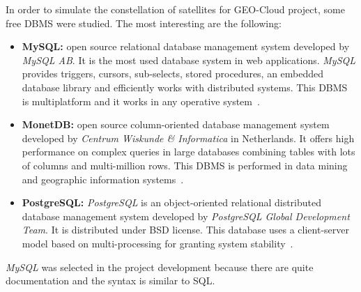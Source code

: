 In order to simulate the constellation of satellites for GEO-Cloud project, some
free \ac{DBMS} were studied. The most interesting are the following:
\begin{itemize}
\item \textbf{MySQL:} open source relational database management system developed by
  \emph{MySQL AB}. It is the most used database system in web applications. \emph{MySQL} provides triggers, cursors, sub-selects, stored
  procedures, an embedded database library and efficiently works with distributed systems. This \ac{DBMS} is multiplatform and it works in any
  operative system~\cite{MySQL}.
\item \textbf{MonetDB:} open source column-oriented database management system
  developed by \emph{Centrum Wiskunde \& Informatica} in Netherlands. It offers
  high performance on complex queries in large databases combining tables with
  lots of columns and multi-million rows. This \ac{DBMS} is performed in data
  mining and geographic information systems~\cite{MonetDB}.
\item \textbf{PostgreSQL:} \emph{PostgreSQL} is an object-oriented relational
  distributed database management system developed by \emph{PostgreSQL Global
    Development Team}. It is distributed under \ac{BSD} license. This database uses a
  client-server model based on multi-processing for granting system stability~\cite{PostgreSQL}.
\end{itemize}

\emph{MySQL} was selected in the project development because there are quite documentation and the
syntax is similar to \ac{SQL}.

